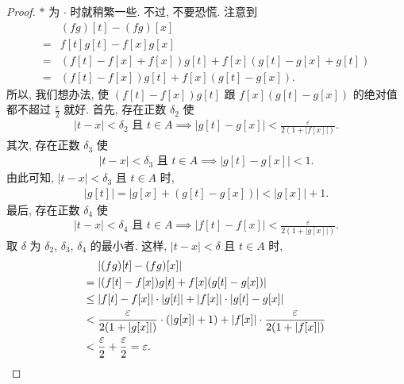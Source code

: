 \begin{proof}
    $\ast$ 为 $\cdot$ 时就稍繁一些.
    不过, 不要恐慌.
    注意到
    \begin{align*}
             & (fg)[t] - (fg)[x]                                   \\
        = {} & f[t]g[t] - f[x]g[x]                                 \\
        = {} & (f[t] - f[x] + f[x])g[t] + f[x](g[t] - g[x] + g[t]) \\
        = {} & (f[t] - f[x])g[t] + f[x](g[t] - g[x]).
    \end{align*}
    所以, 我们想办法, 使
    $(f[t] - f[x])g[t]$
    跟
    $f[x](g[t] - g[x])$
    的绝对值都不超过 $\frac{\varepsilon}{2}$ 就好.
    首先, 存在正数 $\delta_2$ 使
    \begin{align*}
        \text{$|t - x| < \delta_2$ 且 $t \in A$} \implies |g[t] - g[x]| < \frac{\varepsilon}{2(1 + |f[x]|)}.
    \end{align*}
    其次, 存在正数 $\delta_3$ 使
    \begin{align*}
        \text{$|t - x| < \delta_3$ 且 $t \in A$} \implies |g[t] - g[x]| < 1.
    \end{align*}
    由此可知, $|t - x| < \delta_3$ 且 $t \in A$ 时,
    \begin{align*}
        |g[t]| = |g[x] + (g[t] - g[x])| < |g[x]| + 1.
    \end{align*}
    最后, 存在正数 $\delta_4$ 使
    \begin{align*}
        \text{$|t - x| < \delta_4$ 且 $t \in A$} \implies |f[t] - f[x]| < \frac{\varepsilon}{2(1 + |g[x]|)}.
    \end{align*}
    取 $\delta$ 为
    $\delta_2$, $\delta_3$, $\delta_4$ 的最小者.
    这样, $|t - x| < \delta$ 且 $t \in A$ 时,
    \begin{align*}
                & |(fg)[t] - (fg)[x]|                                                                                   \\
        = {}    & |(f[t] - f[x])g[t] + f[x](g[t] - g[x])|                                                               \\
        \leq {} & |f[t] - f[x]| \cdot |g[t]| + |f[x]| \cdot |g[t] - g[x]|                                               \\
        < {}    & \frac{\varepsilon}{2(1 + |g[x]|)} \cdot (|g[x]| + 1) + |f[x]| \cdot \frac{\varepsilon}{2(1 + |f[x]|)} \\
        < {}    & \frac{\varepsilon}{2} + \frac{\varepsilon}{2} = \varepsilon. \qedhere
    \end{align*}
\end{proof}

